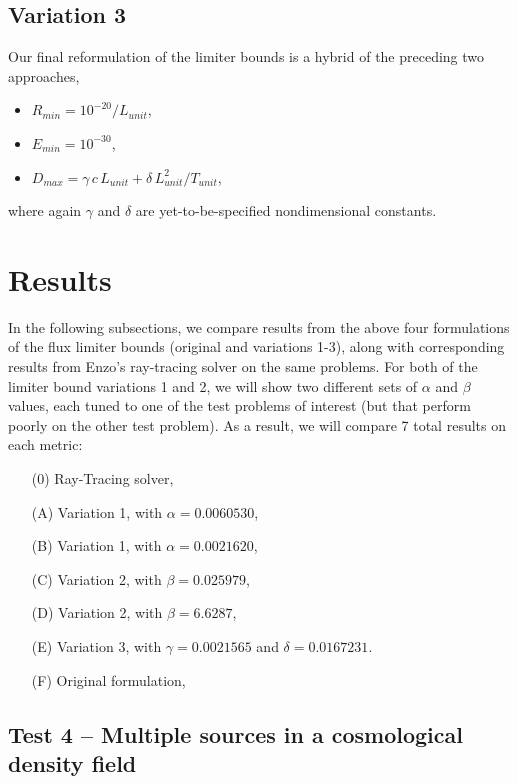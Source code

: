\documentclass[letterpaper,11pt]{article}
\begin{document}
\subsection{Variation 3}
\label{sec:var3}

Our final reformulation of the limiter bounds is a hybrid of the
preceding two approaches,
\begin{itemize}
\item $R_{min} = 10^{-20} / L_{unit}$,
\item $E_{min} = 10^{-30}$,
\item $D_{max} = \gamma\, c\, L_{unit} + \delta\, L_{unit}^2 / T_{unit}$,
\end{itemize}
where again $\gamma$ and $\delta$ are yet-to-be-specified
nondimensional constants. 



\section{Results}
\label{sec:results}


In the following subsections, we compare results from the above four
formulations of the flux limiter bounds (original and variations 1-3),
along with corresponding results from Enzo's ray-tracing solver on the
same problems.  For both of the limiter bound variations 1 and 2, we
will show two different sets of $\alpha$ and $\beta$ values, each
tuned to one of the test problems of interest (but that perform poorly
on the other test problem).  As a result, we will compare 7 total
results on each metric:
\begin{itemize}
\item[(0)] Ray-Tracing solver,
\item[(A)] Variation 1, with $\alpha = 0.0060530$,
\item[(B)] Variation 1, with $\alpha = 0.0021620$,
\item[(C)] Variation 2, with $\beta = 0.025979$,
\item[(D)] Variation 2, with $\beta = 6.6287$,
\item[(E)] Variation 3, with $\gamma = 0.0021565$ and $\delta = 0.0167231$.
\item[(F)] Original formulation,
\end{itemize}



\subsection{Test 4 -- Multiple sources in a cosmological density field}
\label{sec:test4}
\end{document}
